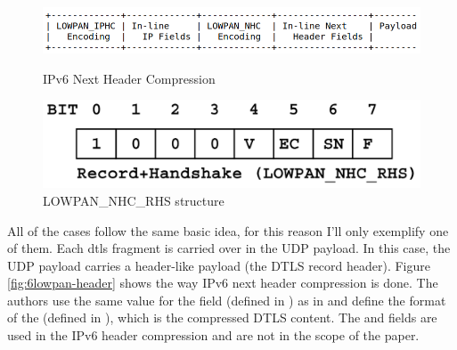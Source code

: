 \documentclass{llncs}
\begin{document}
\begin{figure}
    \centering
    \begin{minipage}{0.5\textwidth}
        \centering
        \includegraphics[width=1.0\textwidth]{img/6lowpan-header.png} %
        \caption{\label{fig:6lowpan-header} IPv6 Next Header Compression}
    \end{minipage}\hfill
    \begin{minipage}{0.5\textwidth}
        \centering
        \includegraphics[width=1.0\textwidth]{img/6lowpan-ghc-rhs.png} %
        \caption{\label{fig:6lowpan-ghc-rhs} LOWPAN\_NHC\_RHS structure}
    \end{minipage}
\end{figure}


All of the cases follow the same basic idea, for this reason I'll only exemplify
one of them. Each \gls{dtls} fragment is carried over in the UDP payload. In this case,
the UDP payload carries a header-like payload (the DTLS record header).
Figure \ref{fig:6lowpan-header} shows the way IPv6 next header compression is done.
The authors use the same value for the  field (defined in \cite{RFC6282})
as in  and define the format of the 
(defined in \cite{RFC6282}), which is the compressed DTLS content. The 
and  fields are used in the IPv6 header compression
and are not in the scope of the paper.
\end{document}
